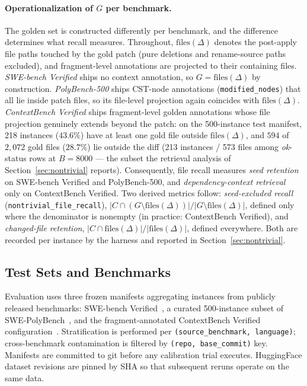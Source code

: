 \documentclass[11pt, a4paper]{article}
\begin{document}
\paragraph{Operationalization of $G$ per benchmark.} The golden set is constructed differently per benchmark, and the difference determines what recall measures. Throughout, $\mathrm{files}(\Delta)$ denotes the post-apply file paths touched by the gold patch (pure deletions and rename-source paths excluded), and fragment-level annotations are projected to their containing files. \emph{SWE-bench Verified} ships no context annotation, so $G = \mathrm{files}(\Delta)$ by construction. \emph{PolyBench-500} ships CST-node annotations (\texttt{modified\_nodes}) that all lie inside patch files, so its file-level projection again coincides with $\mathrm{files}(\Delta)$. \emph{ContextBench Verified} ships fragment-level golden annotations whose file projection genuinely extends beyond the patch: on the 500-instance test manifest, 218 instances ($43.6\%$) have at least one gold file outside $\mathrm{files}(\Delta)$, and $594$ of $2{,}072$ gold files ($28.7\%$) lie outside the diff (213 instances / 573 files among \emph{ok}-status rows at $B{=}8000$ --- the subset the retrieval analysis of Section~\ref{sec:nontrivial} reports). Consequently, file recall measures \emph{seed retention} on SWE-bench Verified and PolyBench-500, and \emph{dependency-context retrieval} only on ContextBench Verified. Two derived metrics follow: \emph{seed-excluded recall} (\texttt{nontrivial\_file\_recall}), $|C \cap (G \setminus \mathrm{files}(\Delta))| / |G \setminus \mathrm{files}(\Delta)|$, defined only where the denominator is nonempty (in practice: ContextBench Verified), and \emph{changed-file retention}, $|C \cap \mathrm{files}(\Delta)|/|\mathrm{files}(\Delta)|$, defined everywhere. Both are recorded per instance by the harness and reported in Section~\ref{sec:nontrivial}.

\subsection{Test Sets and Benchmarks}

Evaluation uses three frozen manifests aggregating instances from publicly released benchmarks: SWE-bench Verified~\cite{jimenez2024swebench,openai2024swebenchverified}, a curated 500-instance subset of SWE-PolyBench~\cite{rashid2025swepolybench}, and the fragment-annotated ContextBench Verified configuration~\cite{li2026contextbench}. Stratification is performed per \texttt{(source\_benchmark, language)}; cross-benchmark contamination is filtered by \texttt{(repo, base\_commit)} key. Manifests are committed to git before any calibration trial executes. HuggingFace dataset revisions are pinned by SHA so that subsequent reruns operate on the same data.
\end{document}

